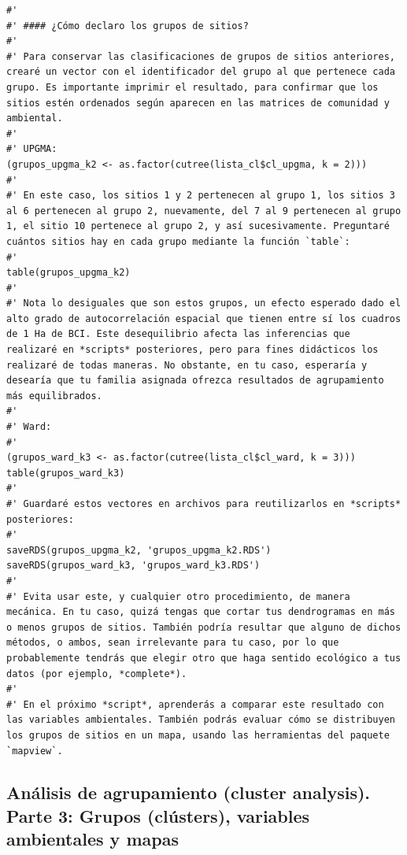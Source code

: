 \documentclass[11pt,]{article}
\begin{document}
\begin{verbatim}
#' 
#' #### ¿Cómo declaro los grupos de sitios?
#' 
#' Para conservar las clasificaciones de grupos de sitios anteriores, crearé un vector con el identificador del grupo al que pertenece cada grupo. Es importante imprimir el resultado, para confirmar que los sitios estén ordenados según aparecen en las matrices de comunidad y ambiental.
#' 
#' UPGMA:
(grupos_upgma_k2 <- as.factor(cutree(lista_cl$cl_upgma, k = 2)))
#' 
#' En este caso, los sitios 1 y 2 pertenecen al grupo 1, los sitios 3 al 6 pertenecen al grupo 2, nuevamente, del 7 al 9 pertenecen al grupo 1, el sitio 10 pertenece al grupo 2, y así sucesivamente. Preguntaré cuántos sitios hay en cada grupo mediante la función `table`:
#' 
table(grupos_upgma_k2)
#' 
#' Nota lo desiguales que son estos grupos, un efecto esperado dado el alto grado de autocorrelación espacial que tienen entre sí los cuadros de 1 Ha de BCI. Este desequilibrio afecta las inferencias que realizaré en *scripts* posteriores, pero para fines didácticos los realizaré de todas maneras. No obstante, en tu caso, esperaría y desearía que tu familia asignada ofrezca resultados de agrupamiento más equilibrados.
#' 
#' Ward:
#' 
(grupos_ward_k3 <- as.factor(cutree(lista_cl$cl_ward, k = 3)))
table(grupos_ward_k3)
#'
#' Guardaré estos vectores en archivos para reutilizarlos en *scripts* posteriores:
#' 
saveRDS(grupos_upgma_k2, 'grupos_upgma_k2.RDS')
saveRDS(grupos_ward_k3, 'grupos_ward_k3.RDS')
#' 
#' Evita usar este, y cualquier otro procedimiento, de manera mecánica. En tu caso, quizá tengas que cortar tus dendrogramas en más o menos grupos de sitios. También podría resultar que alguno de dichos métodos, o ambos, sean irrelevante para tu caso, por lo que probablemente tendrás que elegir otro que haga sentido ecológico a tus datos (por ejemplo, *complete*).
#' 
#' En el próximo *script*, aprenderás a comparar este resultado con las variables ambientales. También podrás evaluar cómo se distribuyen los grupos de sitios en un mapa, usando las herramientas del paquete `mapview`.
\end{verbatim}

\subsection{Análisis de agrupamiento (cluster analysis). Parte 3: Grupos
(clústers), variables ambientales y
mapas}\label{anuxe1lisis-de-agrupamiento-cluster-analysis.-parte-3-grupos-cluxfasters-variables-ambientales-y-mapas}
\end{document}
